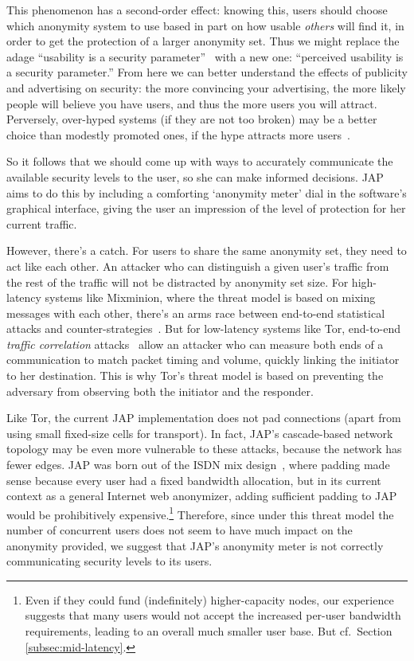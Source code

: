 \documentclass{llncs}
\begin{document}
This phenomenon has a second-order effect: knowing this, users should
choose which anonymity system to use based in part on how usable
\emph{others} will find it, in order to get the protection of a larger
anonymity set. Thus we might replace the adage ``usability is a security
parameter''~\cite{back01} with a new one: ``perceived usability is a
security parameter.'' From here we can better understand the effects
of publicity and advertising on security: the more convincing your
advertising, the more likely people will believe you have users, and thus
the more users you will attract. Perversely, over-hyped systems (if they
are not too broken) may be a better choice than modestly promoted ones,
if the hype attracts more users~\cite{usability-network-effect}.

So it follows that we should come up with ways to accurately communicate
the available security levels to the user, so she can make informed
decisions. JAP aims to do this by including a
comforting `anonymity meter' dial in the software's graphical interface,
giving the user an impression of the level of protection for her current
traffic.

However, there's a catch. For users to share the same anonymity set,
they need to act like each other. An attacker who can distinguish
a given user's traffic from the rest of the traffic will not be
distracted by anonymity set size. For high-latency systems like
Mixminion, where the threat model is based on mixing messages with each
other, there's an arms race between end-to-end statistical attacks and
counter-strategies~\cite{statistical-disclosure,minion-design,e2e-traffic,trickle02}.
But for low-latency systems like Tor, end-to-end \emph{traffic
correlation} attacks~\cite{danezis-pet2004,SS03,defensive-dropping}
allow an attacker who can measure both ends of a communication
to match packet timing and volume, quickly linking
the initiator to her destination. This is why Tor's threat model is
based on preventing the adversary from observing both the initiator and
the responder.

Like Tor, the current JAP implementation does not pad connections
(apart from using small fixed-size cells for transport). In fact,
JAP's cascade-based network topology may be even more vulnerable to these
attacks, because the network has fewer edges. JAP was born out of
the ISDN mix design~\cite{isdn-mixes}, where padding made sense because
every user had a fixed bandwidth allocation, but in its current context
as a general Internet web anonymizer, adding sufficient padding to JAP
would be prohibitively expensive.\footnote{Even if they could fund
(indefinitely) higher-capacity nodes, our experience
suggests that many users would not accept the increased per-user
bandwidth requirements, leading to an overall much smaller user base. But
cf.\ Section \ref{subsec:mid-latency}.} Therefore, since under this threat
model the number of concurrent users does not seem to have much impact
on the anonymity provided, we suggest that JAP's anonymity meter is not
correctly communicating security levels to its users.
\end{document}
